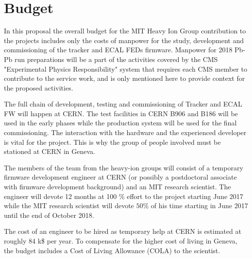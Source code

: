 \section{Budget}
\label{sec:funding}

In this proposal the overall budget for the MIT Heavy Ion Group contribution to the projects includes only the costs of manpower for the study, development and commissioning of the tracker and ECAL FEDs firmware. Manpower for 2018 Pb-Pb run preparations will be a part of the activities covered by the CMS "Experimental Physics Responsibility" system that requires each CMS member to contribute to the service work, and is only mentioned here to provide context for the proposed activities. 

The full chain of development, testing and commissioning of Tracker and ECAL FW will happen at CERN. The test facilities in CERN B906 and B186 will be used in the early phases while the production system will be used for the final commissioning. The interaction with the hardware and the experienced developer is vital for the project. This is why the group of people involved must be stationed at CERN in Geneva.

The members of the team from the heavy-ion groups will consist of a temporary firmware development engineer at CERN (or possibly a postdoctoral associate with firmware development background) and an MIT research scientist. The engineer will devote 12 months at 100 \% effort to the project starting June 2017 while the MIT research scientist will devote $50\%$ of his time starting in June 2017 until the end of October 2018. 
 
The cost of an engineer to be hired as temporary help at CERN is estimated at roughly 84 k\$ per year. To compensate for the higher cost of living in Geneva, the budget includes a Cost of Living Allowance (COLA) to the scientist.  


